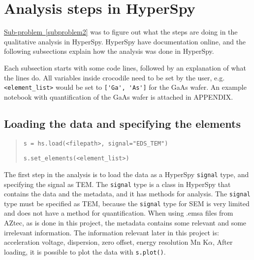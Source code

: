 %
%
\section{Analysis steps in HyperSpy}
\label{sec:discussion:steps}

\hyperref[subproblem2]{Sub-problem~\ref*{subproblem2}} was to figure out what the steps are doing in the qualitative analysis in HyperSpy.
HyperSpy have documentation online, and the following subsections explain how the analysis was done in HyperSpy.

Each subsection starts with some code lines, followed by an explanation of what the lines do.
All variables inside crocodile need to be set by the user, e.g. \verb|<element_list>| would be set to \verb|['Ga', 'As']| for the GaAs wafer.
An example notebook with quantification of the GaAs wafer is attached in APPENDIX.

\subsection{Loading the data and specifying the elements}
\label{sec:discussion:steps:load}

\begin{quote}
    \verb|s = hs.load(<filepath>, signal="EDS_TEM")|

    \verb|s.set_elements(<element_list>)|
\end{quote}

The first step in the analysis is to load the data as a HyperSpy \verb|signal| type, and specifying the signal as TEM.
The \verb|signal| type is a class in HyperSpy that contains the data and the metadata, and it has methods for analysis.
The \verb|signal| type must be specified as TEM, because the \verb|signal| type for SEM is very limited and does not have a method for quantification.
When using .emsa files from AZtec, as is done in this project, the metadata contains some relevant and some irrelevant information.
The information relevant later in this project is:
acceleration voltage, dispersion, zero offset, energy resolution Mn K$\alpha$,
After loading, it is possible to plot the data with \verb|s.plot()|.

